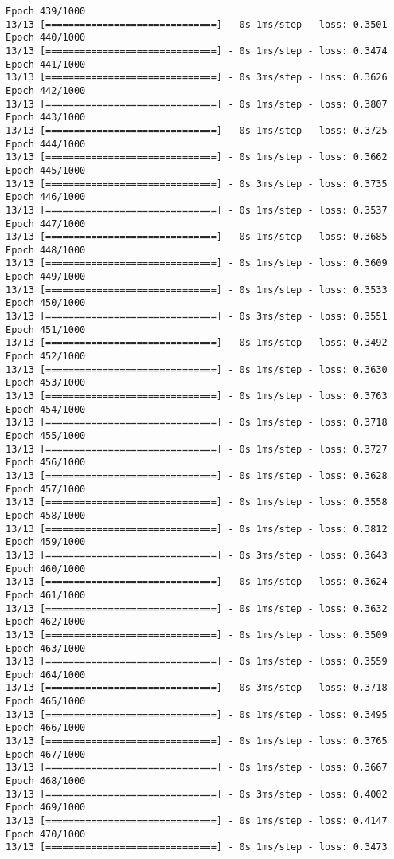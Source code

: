 \documentclass[11pt]{article}
\begin{document}
\begin{Verbatim}[commandchars=\\\{\}]
Epoch 439/1000
13/13 [==============================] - 0s 1ms/step - loss: 0.3501
Epoch 440/1000
13/13 [==============================] - 0s 1ms/step - loss: 0.3474
Epoch 441/1000
13/13 [==============================] - 0s 3ms/step - loss: 0.3626
Epoch 442/1000
13/13 [==============================] - 0s 1ms/step - loss: 0.3807
Epoch 443/1000
13/13 [==============================] - 0s 1ms/step - loss: 0.3725
Epoch 444/1000
13/13 [==============================] - 0s 1ms/step - loss: 0.3662
Epoch 445/1000
13/13 [==============================] - 0s 3ms/step - loss: 0.3735
Epoch 446/1000
13/13 [==============================] - 0s 1ms/step - loss: 0.3537
Epoch 447/1000
13/13 [==============================] - 0s 1ms/step - loss: 0.3685
Epoch 448/1000
13/13 [==============================] - 0s 1ms/step - loss: 0.3609
Epoch 449/1000
13/13 [==============================] - 0s 1ms/step - loss: 0.3533
Epoch 450/1000
13/13 [==============================] - 0s 3ms/step - loss: 0.3551
Epoch 451/1000
13/13 [==============================] - 0s 1ms/step - loss: 0.3492
Epoch 452/1000
13/13 [==============================] - 0s 1ms/step - loss: 0.3630
Epoch 453/1000
13/13 [==============================] - 0s 1ms/step - loss: 0.3763
Epoch 454/1000
13/13 [==============================] - 0s 1ms/step - loss: 0.3718
Epoch 455/1000
13/13 [==============================] - 0s 1ms/step - loss: 0.3727
Epoch 456/1000
13/13 [==============================] - 0s 1ms/step - loss: 0.3628
Epoch 457/1000
13/13 [==============================] - 0s 1ms/step - loss: 0.3558
Epoch 458/1000
13/13 [==============================] - 0s 1ms/step - loss: 0.3812
Epoch 459/1000
13/13 [==============================] - 0s 3ms/step - loss: 0.3643
Epoch 460/1000
13/13 [==============================] - 0s 1ms/step - loss: 0.3624
Epoch 461/1000
13/13 [==============================] - 0s 1ms/step - loss: 0.3632
Epoch 462/1000
13/13 [==============================] - 0s 1ms/step - loss: 0.3509
Epoch 463/1000
13/13 [==============================] - 0s 1ms/step - loss: 0.3559
Epoch 464/1000
13/13 [==============================] - 0s 3ms/step - loss: 0.3718
Epoch 465/1000
13/13 [==============================] - 0s 1ms/step - loss: 0.3495
Epoch 466/1000
13/13 [==============================] - 0s 1ms/step - loss: 0.3765
Epoch 467/1000
13/13 [==============================] - 0s 1ms/step - loss: 0.3667
Epoch 468/1000
13/13 [==============================] - 0s 3ms/step - loss: 0.4002
Epoch 469/1000
13/13 [==============================] - 0s 1ms/step - loss: 0.4147
Epoch 470/1000
13/13 [==============================] - 0s 1ms/step - loss: 0.3473

\end{Verbatim}
\end{document}
